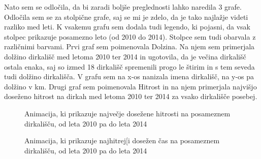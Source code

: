 \documentclass[11pt,a4paper]{article}
\begin{document}
Nato sem se odločila, da bi zaradi boljše preglednosti lahko naredila 3 grafe. Odločila sem se za stolpične grafe, saj se mi je zdelo, da je tako najlažje videti razliko med leti. K vsakemu grafu sem dodala tudi legendo, ki pojasni, da vsak stolpec prikazuje posamezno leto (od 2010 do 2014). Stolpce sem tudi obarvala z različnimi barvami.
Prvi graf sem poimenovala Dolzina. Na njem sem primerjala dolžino dirkališč med letoma 2010 ter 2014 in ugotovila, da je večina dirkališč ostala enaka, saj so izmed 18 dirkališč spremenili progo le štirim in s tem seveda tudi dolžino dirkališča. V grafu sem na x-os nanizala imena dirkališč, na y-os pa dolžino v km.
Drugi graf sem poimenovala Hitrost in na njem primerjala najvišjo doseženo hitrost na dirkah med letoma 2010 ter 2014 za vsako dirkališče posebej.  



\begin{figure}[H] 
\caption{Animacija, ki prikazuje največje dosežene hitrosti na posameznem dirkališču, od leta 2010 pa do leta 2014} 
\end{figure} 

\begin{figure}[H] 
\caption{Animacija, ki prikazuje najhitrej[i dosežen čas na posameznem dirkališču, od leta 2010 pa do leta 2014} 
\end{figure} 




 


\end{document}
